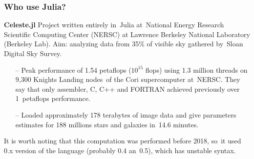 \documentclass{beamer}  %
\begin{document}
\begin{frame}
  \frametitle{Who use Julia?}

  \begin{block}{\textbf{Celeste.jl}}
    Project written entirely in~Julia at~National Energy Research
    Scientific Computing Center (NERSC) at Lawrence Berkeley National
    Laboratory (Berkeley Lab). Aim: analyzing data from 35\% of
    visible sky gathered by~Sloan Digital Sky Survey.
    \begin{itemize}
    \item[--] Peak performance of 1.54 petaflops ($10^{ 15 }$ flops)
      using 1.3 million threads on 9,300 Knights Landing nodes~of the
      Cori supercomputer at~NERSC. They say that only assembler, C,
      C++ and FORTRAN achieved previously over 1~petaflops
      performance.
    \item[--] Loaded approximately 178 terabytes of image data and
      give parameters estimates for 188 millions stars and galaxies
      in~14.6 minutes.
    \end{itemize}
    It is worth noting that this computation was performed before
    2018, so~it used 0.x version of the language (probably 0.4
    an~0.5), which has unstable syntax.
  \end{block}

\end{frame}
\end{document}

